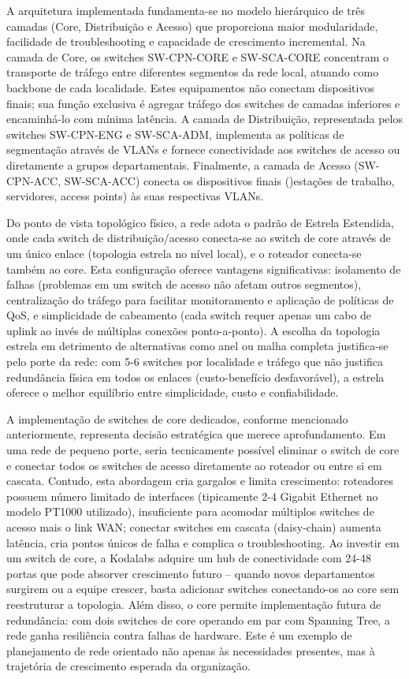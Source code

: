 \documentclass[12pt,a4paper]{article}
\begin{document}
    A arquitetura implementada fundamenta-se no modelo hierárquico de três camadas (Core, Distribuição e Acesso) que proporciona maior modularidade, facilidade de troubleshooting e capacidade de crescimento incremental. Na camada de Core, os switches SW-CPN-CORE e SW-SCA-CORE concentram o transporte de tráfego entre diferentes segmentos da rede local, atuando como backbone de cada localidade. Estes equipamentos não conectam dispositivos finais; sua função exclusiva é agregar tráfego dos switches de camadas inferiores e encaminhá-lo com mínima latência. A camada de Distribuição, representada pelos switches SW-CPN-ENG e SW-SCA-ADM, implementa as políticas de segmentação através de VLANs e fornece conectividade aos switches de acesso ou diretamente a grupos departamentais. Finalmente, a camada de Acesso (SW-CPN-ACC, SW-SCA-ACC) conecta os dispositivos finais ()estações de trabalho, servidores, access points) às suas respectivas VLANs.

Do ponto de vista topológico físico, a rede adota o padrão de Estrela Estendida, onde cada switch de distribuição/acesso conecta-se ao switch de core através de um único enlace (topologia estrela no nível local), e o roteador conecta-se também ao core. Esta configuração oferece vantagens significativas: isolamento de falhas (problemas em um switch de acesso não afetam outros segmentos), centralização do tráfego para facilitar monitoramento e aplicação de políticas de QoS, e simplicidade de cabeamento (cada switch requer apenas um cabo de uplink ao invés de múltiplas conexões ponto-a-ponto). A escolha da topologia estrela em detrimento de alternativas como anel ou malha completa justifica-se pelo porte da rede: com 5-6 switches por localidade e tráfego que não justifica redundância física em todos os enlaces (custo-benefício desfavorável), a estrela oferece o melhor equilíbrio entre simplicidade, custo e confiabilidade.

A implementação de switches de core dedicados, conforme mencionado anteriormente, representa decisão estratégica que merece aprofundamento. Em uma rede de pequeno porte, seria tecnicamente possível eliminar o switch de core e conectar todos os switches de acesso diretamente ao roteador ou entre si em cascata. Contudo, esta abordagem cria gargalos e limita crescimento: roteadores possuem número limitado de interfaces (tipicamente 2-4 Gigabit Ethernet no modelo PT1000 utilizado), insuficiente para acomodar múltiplos switches de acesso mais o link WAN; conectar switches em cascata (daisy-chain) aumenta latência, cria pontos únicos de falha e complica o troubleshooting. Ao investir em um switch de core, a Kodalabs adquire um hub de conectividade com 24-48 portas que pode absorver crescimento futuro -- quando novos departamentos surgirem ou a equipe crescer, basta adicionar switches conectando-os ao core sem reestruturar a topologia. Além disso, o core permite implementação futura de redundância: com dois switches de core operando em par com Spanning Tree, a rede ganha resiliência contra falhas de hardware. Este é um exemplo de planejamento de rede orientado não apenas às necessidades presentes, mas à trajetória de crescimento esperada da organização.
\end{document}
